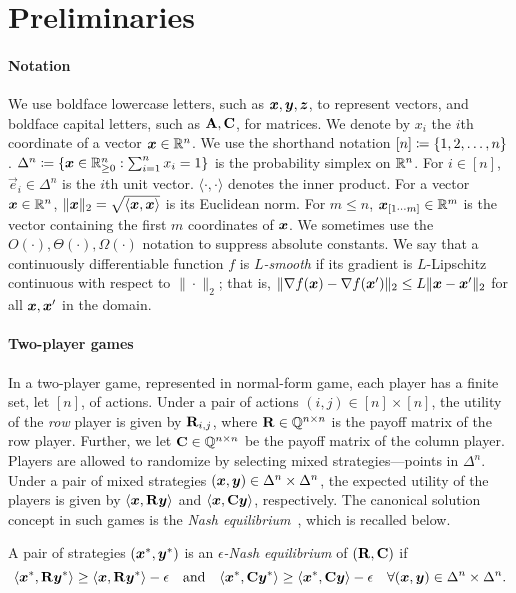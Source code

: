 \section{Preliminaries}

\paragraph{Notation} We use boldface lowercase letters, such as ${\bm{x}}, {\bm{y}}, {\bm{z}}$, to represent vectors, and boldface capital letters, such as $\mathbf{A}, \mathbf{C}$, for matrices. We denote by $x_i$ the $i$th coordinate of a vector ${\bm{x}} \in \mathbb{R}^n$. We use the shorthand notation $[n] \coloneqq \{1, 2, \dots, n\}$. $\Delta^n \coloneqq \{ {\bm{x}} \in \mathbb{R}^n_{\geq 0} : \sum_{i=1}^n x_i = 1 \}$ is the probability simplex on $\mathbb{R}^n$. For $i \in [n]$, $\vec{e}_i \in \Delta^n$ is the $i$th unit vector. $\langle \cdot, \cdot \rangle$ denotes the inner product. For a vector ${\bm{x}} \in \mathbb{R}^n$, $\|{\bm{x}}\|_2 = \sqrt{\langle {\bm{x}}, {\bm{x}} \rangle}$ is its Euclidean norm. For $m \leq n$, ${\bm{x}}_{[1 \cdots m]} \in \mathbb{R}^m$ is the vector containing the first $m$ coordinates of ${\bm{x}}$. We sometimes use the $O(\cdot), \Theta(\cdot), \Omega(\cdot)$ notation to suppress absolute constants. We say that a continuously differentiable function $f$ is \emph{$L$-smooth} if its gradient is $L$-Lipschitz continuous with respect to $\|\cdot\|_2$; that is, $\| \nabla f({\bm{x}}) - \nabla f({\bm{x}}')  \|_2 \leq L \| {\bm{x}} - {\bm{x}}' \|_2$ for all ${\bm{x}}, {\bm{x}}'$ in the domain.

\paragraph{Two-player games} In a two-player game, represented in normal-form game, each player has a finite set, let $[n]$, of actions. Under a pair of actions $(i, j) \in [n] \times [n]$, the utility of the \emph{row} player is given by $\mathbf{R}_{i, j} $, where $\mathbf{R} \in \mathbb{Q}^{n \times n}$ is the payoff matrix of the row player. Further, we let $\mathbf{C} \in \mathbb{Q}^{n \times n}$ be the payoff matrix of the column player. Players are allowed to randomize by selecting mixed strategies---points in $\Delta^n$. Under a pair of mixed strategies $({\bm{x}}, {\bm{y}}) \in \Delta^n \times \Delta^n$, the expected utility of the players is given by $\langle {\bm{x}}, \mathbf{R} {\bm{y}} \rangle$ and $\langle {\bm{x}}, \mathbf{C} {\bm{y}} \rangle$, respectively. The canonical solution concept in such games is the \emph{Nash equilibrium}~\citep{nash1951non}, which is recalled below.

\begin{definition}
    \label{def:NE}
    A pair of strategies $({\bm{x}}^*, {\bm{y}}^*)$ is an \emph{$\epsilon$-Nash equilibrium} of $(\mathbf{R}, \mathbf{C})$ if
    \[
        \langle {\bm{x}}^*, \mathbf{R} {\bm{y}}^* \rangle \geq \langle {\bm{x}}, \mathbf{R} {\bm{y}}^* \rangle - \epsilon \quad \text{and} \quad \langle {\bm{x}}^*, \mathbf{C} {\bm{y}}^* \rangle \geq \langle {\bm{x}}^*, \mathbf{C} {\bm{y}} \rangle - \epsilon \quad \forall ({\bm{x}}, {\bm{y}}) \in \Delta^n \times \Delta^n.
    \]
\end{definition}

